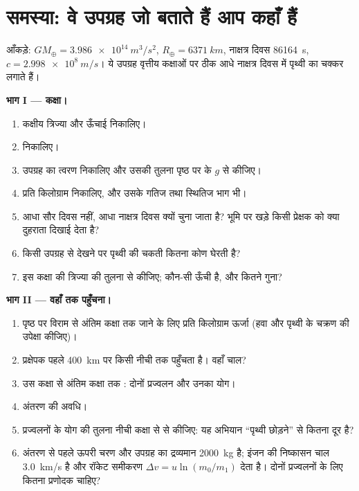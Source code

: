 \section{समस्या: वे उपग्रह जो बताते हैं आप कहाँ हैं}

\begin{problem}
\label{pb:b1:central-forces:1}
आँकड़े: $GM_\oplus = \qty{3.986e14}{m^3/s^2}$, $R_\oplus = \qty{6371}{km}$,
नाक्षत्र दिवस \qty{86164}{s}, $c = \qty{2.998e8}{m/s}$। ये उपग्रह वृत्तीय
कक्षाओं पर ठीक आधे नाक्षत्र दिवस में पृथ्वी का चक्कर लगाते हैं।

\medskip
\noindent\textbf{भाग I --- कक्षा।}
\begin{enumerate}
  \item कक्षीय त्रिज्या और ऊँचाई निकालिए।
  \item {} निकालिए।
  \item उपग्रह का त्वरण निकालिए और उसकी तुलना पृष्ठ पर के $g$ से कीजिए।
  \item प्रति किलोग्राम  निकालिए, और उसके गतिज तथा स्थितिज
        भाग भी।
  \item आधा सौर दिवस नहीं, आधा नाक्षत्र दिवस क्यों चुना जाता है? भूमि पर
        खड़े किसी प्रेक्षक को क्या दुहराता दिखाई देता है?
  \item किसी उपग्रह से देखने पर पृथ्वी की चकती कितना कोण घेरती है?
  \item इस कक्षा की त्रिज्या की तुलना  से कीजिए; कौन-सी ऊँची
        है, और कितने गुना?
\end{enumerate}

\medskip
\noindent\textbf{भाग II --- वहाँ तक पहुँचना।}
\begin{enumerate}[resume]
  \item पृष्ठ पर विराम से अंतिम कक्षा तक जाने के लिए प्रति किलोग्राम
        ऊर्जा (हवा और पृथ्वी के चक्रण की उपेक्षा कीजिए)।
  \item प्रक्षेपक पहले \qty{400}{km} पर किसी नीची  तक पहुँचता
        है। वहाँ चाल?
  \item उस कक्षा से अंतिम कक्षा तक : दोनों प्रज्वलन और उनका
        योग।
  \item अंतरण की अवधि।
  \item प्रज्वलनों के योग की तुलना नीची कक्षा से  से कीजिए: यह
        अभियान ``पृथ्वी छोड़ने'' से कितना दूर है?
  \item अंतरण से पहले ऊपरी चरण और उपग्रह का द्रव्यमान \qty{2000}{kg} है;
        इंजन की निष्कासन चाल \qty{3.0}{km/s} है और रॉकेट समीकरण
        $\Delta v = u\ln(m_0/m_1)$ देता है। दोनों प्रज्वलनों के लिए कितना
        प्रणोदक चाहिए?
\end{enumerate}


\end{problem}
